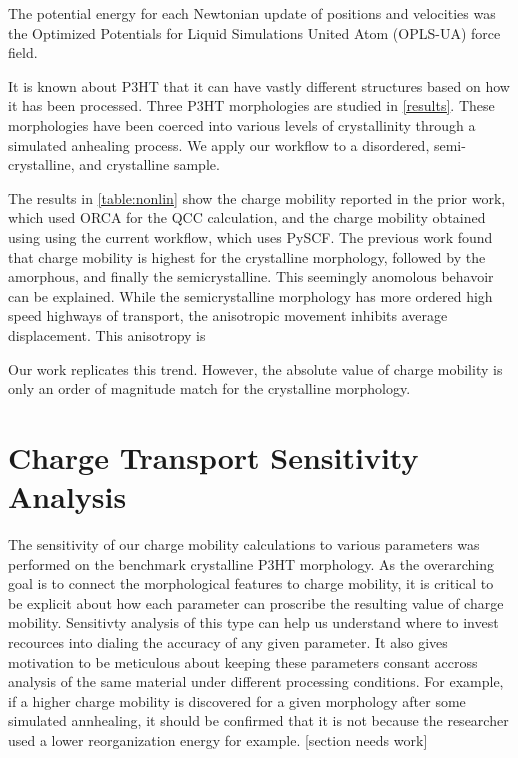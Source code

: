 The potential energy for each Newtonian update of positions and velocities 
was the Optimized Potentials for Liquid Simulations United Atom (OPLS-UA) force field.


It is known about P3HT that it can have vastly different structures based on how it has been processed. 
Three P3HT morphologies are studied in \autoref{results}. These morphologies have been coerced into various levels of crystallinity through a simulated anhealing process. We apply our workflow to a disordered, semi-crystalline, and crystalline sample.

The results in \ref{table:nonlin} show the charge mobility reported in the prior work, which used ORCA for
the QCC calculation, and the charge mobility obtained using using the current workflow, which uses PySCF. 
The previous work found that charge mobility is highest for the crystalline morphology, followed by the
amorphous, and finally the semicrystalline. This seemingly anomolous behavoir can be explained. While the
semicrystalline morphology has more ordered high speed highways of transport, the anisotropic movement
inhibits average displacement. This anisotropy is

Our work replicates this trend. However, the absolute value of charge mobility is only an order of magnitude
match for the crystalline morphology. 

\section{Charge Transport Sensitivity Analysis}

\label{Sensitivity}

The sensitivity of our charge mobility calculations to various parameters was performed on the benchmark 
crystalline P3HT morphology. As the overarching goal is to connect the morphological features to charge
mobility, it is critical to be explicit about how each parameter can proscribe the resulting value of charge
mobility. Sensitivty analysis of this type can help us understand where to invest recources into dialing
the accuracy of any given parameter. It also gives motivation to be meticulous about keeping these parameters
consant accross analysis of the same material under different processing conditions. For example, if a higher
charge mobility is discovered for a given morphology after some simulated annhealing,
it should be confirmed that it is not because the researcher used a lower reorganization energy for example. 
[section needs work]


